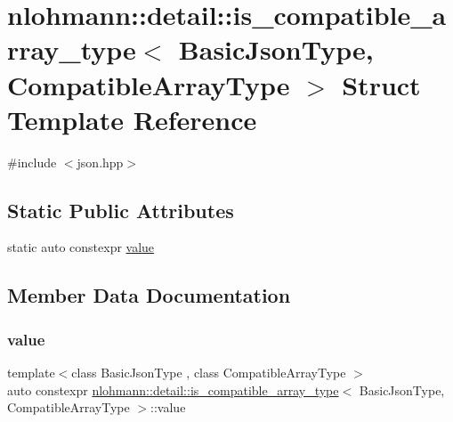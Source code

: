 \hypertarget{structnlohmann_1_1detail_1_1is__compatible__array__type}{}\section{nlohmann\+:\+:detail\+:\+:is\+\_\+compatible\+\_\+array\+\_\+type$<$ Basic\+Json\+Type, Compatible\+Array\+Type $>$ Struct Template Reference}
\label{structnlohmann_1_1detail_1_1is__compatible__array__type}


{\ttfamily \#include $<$json.\+hpp$>$}

\subsection*{Static Public Attributes}
\begin{DoxyCompactItemize}
\item 
static auto constexpr \hyperlink{structnlohmann_1_1detail_1_1is__compatible__array__type_a01bc2274c22746bbb2cefd2acee8b572}{value}
\end{DoxyCompactItemize}


\subsection{Member Data Documentation}
\mbox{\label{structnlohmann_1_1detail_1_1is__compatible__array__type_a01bc2274c22746bbb2cefd2acee8b572}} 
\subsubsection{\texorpdfstring{value}{value}}
{\footnotesize\ttfamily template$<$class Basic\+Json\+Type , class Compatible\+Array\+Type $>$ \\
auto constexpr \hyperlink{structnlohmann_1_1detail_1_1is__compatible__array__type}{nlohmann\+::detail\+::is\+\_\+compatible\+\_\+array\+\_\+type}$<$ Basic\+Json\+Type, Compatible\+Array\+Type $>$\+::value\hspace{0.3cm}{\ttfamily [static]}}

